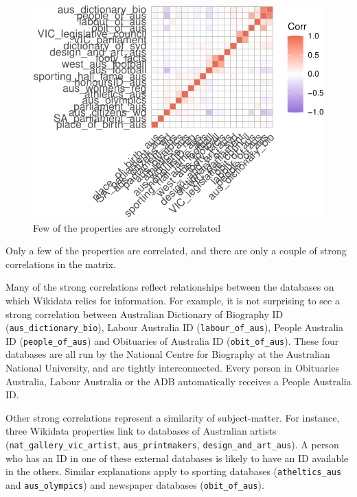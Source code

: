 \documentclass[
  a4paper,
  DIV=11,
  numbers=noendperiod]{scrreprt}
\begin{document}
\begin{figure}

{\centering \includegraphics{who-counts_files/figure-pdf/fig-wikidata-property-matrix-1.pdf}

}

\caption{\label{fig-wikidata-property-matrix}Few of the properties are
strongly correlated}

\end{figure}

Only a few of the properties are correlated, and there are only a couple
of strong correlations in the matrix.

Many of the strong correlations reflect relationships between the
databases on which Wikidata relies for information. For example, it is
not surprising to see a strong correlation between Australian Dictionary
of Biography ID (\texttt{aus\_dictionary\_bio}), Labour Australia ID
(\texttt{labour\_of\_aus}), People Australia ID
(\texttt{people\_of\_aus}) and Obituaries of Australia ID
(\texttt{obit\_of\_aus}). These four databases are all run by the
National Centre for Biography at the Australian National University, and
are tightly interconnected. Every person in Obituaries Australia, Labour
Australia or the ADB automatically receives a People Australia ID.

Other strong correlations represent a similarity of subject-matter. For
instance, three Wikidata properties link to databases of Australian
artists (\texttt{nat\_gallery\_vic\_artist}, \texttt{aus\_printmakers},
\texttt{design\_and\_art\_aus}). A person who has an ID in one of these
external databases is likely to have an ID available in the others.
Similar explanations apply to sporting databases
(\texttt{atheltics\_aus} and \texttt{aus\_olympics}) and newspaper
databases (\texttt{obit\_of\_aus}).
\end{document}
